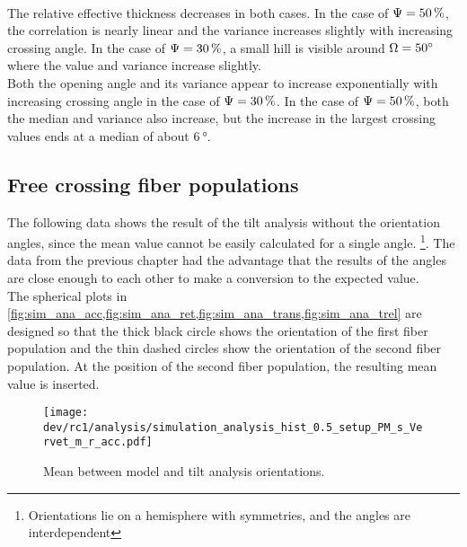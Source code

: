 \\
The relative effective thickness \trel{} decreases in both cases.
In the case of $\textnormal{$\Psi$} = \SI{50}{\percent}$, the correlation is nearly linear and the variance increases slightly with increasing crossing angle.
In the case of $\textnormal{$\Psi$} = \SI{30}{\percent}$, a small hill is visible around $\textnormal{$\Omega$} = \SI{50}{\degree}$ where the value and variance increase slightly.
\\
Both the opening angle and its variance appear to increase exponentially with increasing crossing angle in the case of $\textnormal{$\Psi$} = \SI{30}{\percent}$.
In the case of $\textnormal{$\Psi$} = \SI{50}{\percent}$, both the median and variance also increase, but the increase in the largest crossing values ends at a median of about $\SI{6}{\degree}$.
% 
\subsection{Free crossing fiber populations}
\label{sec:resFreeCross}
% 
The following data shows the result of the tilt analysis without the orientation angles, since the mean value cannot be easily calculated for a single angle. \footnote{Orientations lie on a hemisphere with symmetries, and the angles are interdependent}.
The data from the previous chapter had the advantage that the results of the angles are close enough to each other to make a conversion to the expected value.
\\
% 
The spherical plots in \cref{fig:sim_ana_acc,fig:sim_ana_ret,fig:sim_ana_trans,fig:sim_ana_trel} are designed so that the thick black circle shows the orientation of the first fiber population and the thin dashed circles show the orientation of the second fiber population. 
At the position of the second fiber population, the resulting mean value is inserted.
% 
% 
% 
\begin{figure}[!p]
\centering
\texttt{[image: dev/rc1/analysis/simulation\_analysis\_hist\_0.5\_setup\_PM\_s\_Vervet\_m\_r\_acc.pdf]}
\caption[Simulation acc]{Mean \acc{} between model and tilt analysis orientations.}
\label{fig:sim_ana_acc}
\end{figure}
% 
